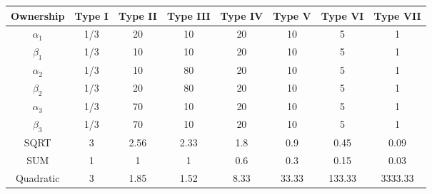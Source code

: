     \begin{tabular}{cccccccc}
    \hline\hline
        Ownership  & Type I & Type II & Type III & Type IV & Type V & Type VI & Type VII \\
          \hline
    $ \alpha_1 $    & 1/3 &20      &  10   & 20    & 10    & 5     & 1  \\
    $ \beta_1 $    & 1/3  & 10    & 10   & 20    & 10    & 5     & 1  \\
    $ \alpha_2 $    & 1/3  & 10    & 80    & 20    & 10    & 5     & 1 \\
    $ \beta_2 $    & 1/3  & 20    & 80    & 20    & 10    & 5     & 1  \\
    $ \alpha_3 $    & 1/3  & 70    & 10    & 20    & 10    & 5     & 1 \\
    $ \beta_3 $    & 1/3  & 70    & 10   & 20    & 10    & 5     & 1  \\
    \hline
    SQRT  & 3     &  2.56  & 2.33 & 1.8   & 0.9   & 0.45  & 0.09 \\
    SUM   & 1     & 1     & 1     & 0.6   & 0.3   & 0.15  & 0.03 \\
    Quadratic & 3     & 1.85  & 1.52  & 8.33  & 33.33 & 133.33 & 3333.33 \\
 
    \hline\hline
    \end{tabular}%